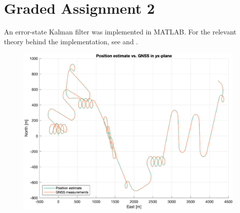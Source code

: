 \section{Graded Assignment 2}\label{sec:graded_assignment_2}


An error-state Kalman filter was implemented in MATLAB. For the relevant theory behind the implementation, see \cite{Sola} and \cite{Edmund}.

\begin{figure}[!htb]
    \centering
    \includegraphics{figures/ga_2/sim_trajectory.eps}
    \caption{}
    \label{}
\end{figure}
